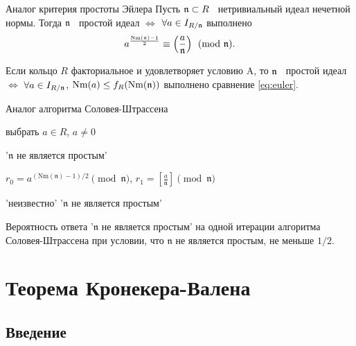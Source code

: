 \documentclass[8pt, xcolor=x11names]{beamer}
\begin{document}
\begin{frame}
    \begin{block}{Аналог критерия простоты Эйлера}
        Пусть $\mathfrak{n} \subset R$ \textendash\ нетривиальный идеал нечетной нормы.
        Тогда $\mathfrak{n}$ \textendash\ простой идеал $\Leftrightarrow$ $\forall a \in I_{R/\mathfrak{n}}$ выполнено
        \begin{equation}\label{eq:euler}
            a^{\frac{\textrm{Nm}(\mathfrak{n}) - 1}{2}} \equiv \left(\frac{a}{\mathfrak{n}}\right) \pmod{\mathfrak{n}}.
        \end{equation}
    
        Если кольцо $R$ факториальное и удовлетворяет условию A, то $\mathfrak{n}$ \textendash\ простой идеал $\Leftrightarrow$ $\forall a \in I_{R/\mathfrak{n}}$, $\textrm{Nm}(a) \le f_R(\textrm{Nm}(\mathfrak{n}))$ выполнено сравнение \ref{eq:euler}.
    \end{block}

    \begin{block}{Аналог алгоритма Соловея-Штрассена}
        \begin{algorithmic}[1]
            \State выбрать $a \in R$, $a \neq 0$

                \State\Return '$\mathfrak{n}$ не является простым'
            \EndIf

            \State $r_0 = a^{(\textrm{Nm}(\mathfrak{n}) - 1) / 2} \pmod{\mathfrak{n}}$, $r_1 = \left[\frac{a}{\mathfrak{n}}\right] \pmod{\mathfrak{n}}$
    		
    		    \State\Return 'неизвестно'
    		\Else
    		    \State\Return '$\mathfrak{n}$ не является простым'
    		\EndIf
        \end{algorithmic}

        Вероятность ответа '$\mathfrak{n}$ не является простым' на одной итерации алгоритма Соловея-Штрассена при условии, что $\mathfrak{n}$ не является простым, не меньше $1/2$.
    \end{block}
\end{frame}

\section{Теорема Кронекера-Валена}

\subsection{Введение}
\end{document}
